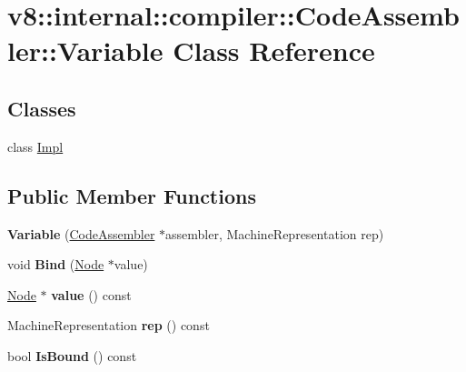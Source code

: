 \hypertarget{classv8_1_1internal_1_1compiler_1_1_code_assembler_1_1_variable}{}\section{v8\+:\+:internal\+:\+:compiler\+:\+:Code\+Assembler\+:\+:Variable Class Reference}
\label{classv8_1_1internal_1_1compiler_1_1_code_assembler_1_1_variable}
\subsection*{Classes}
\begin{DoxyCompactItemize}
\item 
class \hyperlink{classv8_1_1internal_1_1compiler_1_1_code_assembler_1_1_variable_1_1_impl}{Impl}
\end{DoxyCompactItemize}
\subsection*{Public Member Functions}
\begin{DoxyCompactItemize}
\item 
{\bfseries Variable} (\hyperlink{classv8_1_1internal_1_1compiler_1_1_code_assembler}{Code\+Assembler} $\ast$assembler, Machine\+Representation rep)\hypertarget{classv8_1_1internal_1_1compiler_1_1_code_assembler_1_1_variable_ae5520b4242ce7bb8d77f8a9db254718d}{}\label{classv8_1_1internal_1_1compiler_1_1_code_assembler_1_1_variable_ae5520b4242ce7bb8d77f8a9db254718d}

\item 
void {\bfseries Bind} (\hyperlink{classv8_1_1internal_1_1compiler_1_1_node}{Node} $\ast$value)\hypertarget{classv8_1_1internal_1_1compiler_1_1_code_assembler_1_1_variable_a2e514c2379c0ed80610aaf258d6c6560}{}\label{classv8_1_1internal_1_1compiler_1_1_code_assembler_1_1_variable_a2e514c2379c0ed80610aaf258d6c6560}

\item 
\hyperlink{classv8_1_1internal_1_1compiler_1_1_node}{Node} $\ast$ {\bfseries value} () const \hypertarget{classv8_1_1internal_1_1compiler_1_1_code_assembler_1_1_variable_a0c789e57e6806a9aa42fd6bf6a0d7815}{}\label{classv8_1_1internal_1_1compiler_1_1_code_assembler_1_1_variable_a0c789e57e6806a9aa42fd6bf6a0d7815}

\item 
Machine\+Representation {\bfseries rep} () const \hypertarget{classv8_1_1internal_1_1compiler_1_1_code_assembler_1_1_variable_adb5007a99e2bc45d739eae9ba23ed267}{}\label{classv8_1_1internal_1_1compiler_1_1_code_assembler_1_1_variable_adb5007a99e2bc45d739eae9ba23ed267}

\item 
bool {\bfseries Is\+Bound} () const \hypertarget{classv8_1_1internal_1_1compiler_1_1_code_assembler_1_1_variable_a06ff6427019bfb65779d030c747ea3dc}{}\label{classv8_1_1internal_1_1compiler_1_1_code_assembler_1_1_variable_a06ff6427019bfb65779d030c747ea3dc}

\end{DoxyCompactItemize}
